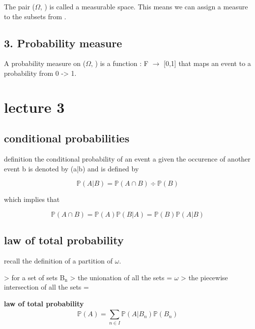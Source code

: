 \documentclass[11pt]{article}
\begin{document}
The pair (\(\Omega\), ) is called a measurable space. This means we can assign a measure to the subsets from .
\subsection{3. Probability measure }
\label{sec:orga655d70}
A probability measure  on (\(\Omega\), ) is a function : F \(\rightarrow\) [0,1] that maps an event to a probability from 0 -> 1.

\section{lecture 3}
\label{sec:orga99be75}
\subsection{conditional probabilities}
\label{sec:orge220067}
definition
the conditional probability of an event a given the occurence of another event b is denoted by (a|b) and is defined by

\begin{equation}

\mathbb{P}(A|B) = \mathbb{P}(A \cap B) \div \mathbb{P}(B)

\end{equation}

which implies that

\begin{equation}

\mathbb{P}(A \cap B) = \mathbb{P}(A) \mathbb{P}(B|A)

            = \mathbb{P}(B) \mathbb{P}(A|B)

\end{equation}

\subsection{law of total probability}
\label{sec:orgfb85d5c}
recall the definition of a partition of \(\omega\).

> for a set of sets B\(_{\text{n}}\)
> the unionation of all the sets = \(\omega\)
> the piecewise intersection of all the sets = \varnothing

\textbf{law of total probability}
\begin{equation}

\mathbb{P}(A) = \displaystyle\sum_{n \in I}^{} \mathbb{P}(A|B_{n}) \mathbb{P}(B_{n})

\end{equation}
\end{document}
